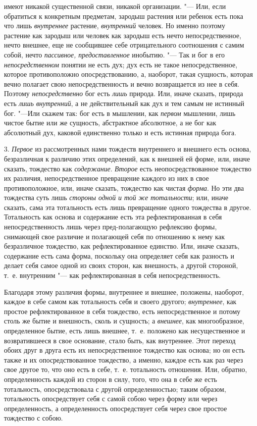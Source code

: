 имеют никакой существенной связи, никакой организации. "--- Или, если
обратиться к конкретным предметам, зародыш растения или ребенок есть пока
что лишь {\em внутреннее} растение,
{\em внутренний} человек. Но именно поэтому растение
как зародыш или человек как зародыш есть нечто непосредственное, нечто
внешнее, еще не сообщившее себе отрицательного соотношения с самим собой,
нечто {\em пассивное, предоставленное} инобытию. "--- Так
и бог в его {\em непосредственном} понятии не есть дух;
дух есть не такое непосредственное, которое противоположно
опосредствованию, а, наоборот, такая сущность, которая вечно полагает свою
непосредственность и вечно возвращается из нее в себя. Поэтому
{\em непосредственно} бог есть
{\em лишь} природа. Или, иначе сказать, природа есть
{\em лишь внутренний}, а не действительный как дух и
тем самым не истинный бог. "---Или скажем так: бог есть в мышлении, как
{\em первом} мышлении, лишь чистое бытие или же
сущность, абстрактное абсолютное, а не бог как абсолютный дух, каковой
единственно только и есть истинная природа бога.

3. {\em Первое} из рассмотренных нами тождеств
внутреннего и внешнего есть основа, безразличная к различию этих
определений, как к внешней ей форме, или, иначе сказать, тождество как
{\em содержание}. {\em Второе} есть
неопосредствованное тождество их различия, непосредственное превращение
каждого из них в свое противоположное, или, иначе сказать, тождество как
чистая {\em форма}. Но эти два тождества суть лишь
{\em стороны одной и той же тотальности}; или, иначе
сказать, сама эта тотальность есть лишь превращение одного тождества в
другое. Тотальность как основа и содержание есть эта рефлектированная в
себя непосредственность лишь через пред-полагающую рефлексию формы,
снимающей свое различие и полагающей себя по отношению к нему как
безразличное тождество, как рефлектированное единство. Или, иначе сказать,
содержание есть сама форма, поскольку она определяет себя как разность и
делает себя самое одной из своих сторон, как внешность, а другой стороной,
т.~е. внутренним "--- как рефлектированная в себя непосредственность.

Благодаря этому различия формы, внутреннее и внешнее, положены, наоборот,
каждое в себе самом как тотальность себя и своего другого;
{\em внутреннее}, как простое рефлектированное в себя
тождество, есть непосредственное и потому столь же бытие и внешность, сколь
и сущность; а {\em внешнее}, как многообразное,
определенное бытие, есть лишь внешнее, т.~е. положено как несущественное и
возвратившееся в свое основание, стало быть, как внутреннее. Этот переход
обоих друг в друга есть их непосредственное тождество как основа; но он
есть также и их опосредствованное тождество, а именно, каждое есть как раз
через свое другое то, что оно есть в себе, т.~е. тотальность отношения.
Или, обратно, определенность каждой из сторон в силу, того, что она в себе
же есть тотальность, опосредствовала с другой определенностью; таким
образом, тотальность опосредствует себя с самой собою через форму или через
определенность, а определенность опосредствует себя через свое простое
тождество с собою.

